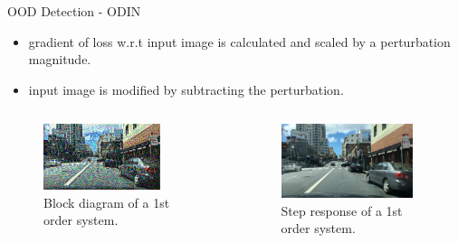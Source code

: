 \documentclass[10pt, aspectratio=169]{beamer}
\begin{document}
\begin{frame}[allowframebreaks]{OOD Detection - ODIN}
    \begin{itemize}
        \item gradient of loss w.r.t input image is calculated and scaled by a perturbation magnitude. 
        \item input image is modified by subtracting the perturbation.
    \end{itemize}
    \begin{columns}[c]
            \begin{column}{.33\textwidth}
            \begin{figure}
                \centering
                \includegraphics[width=0.8\textwidth]{images/image_0.2_10.png}
                \caption{Block diagram of a 1st order system.}
            \end{figure}      
            \end{column}
            \begin{column}{.33\textwidth}
            \begin{figure}
                \centering
                \includegraphics[width=0.9\textwidth]{images/image_0.005_1000.png}
                \caption{Step response of a 1st order system.}
            \end{figure}
            \end{column}


\end{columns}
\end{frame}
\end{document}
